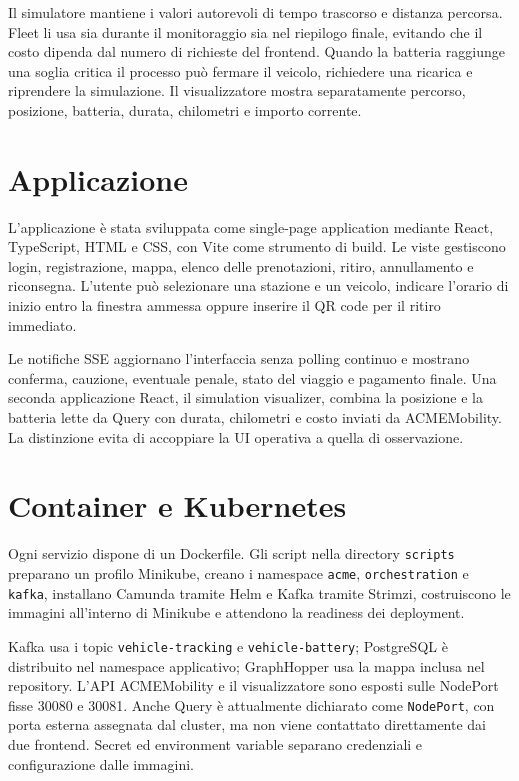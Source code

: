 \documentclass[12pt,a4paper,twoside]{report}
\newcommand{\code}[1]{\texttt{#1}}
\begin{document}
Il simulatore mantiene i valori autorevoli di tempo trascorso e distanza
percorsa. Fleet li usa sia durante il monitoraggio sia nel riepilogo finale,
evitando che il costo dipenda dal numero di richieste del frontend. Quando la
batteria raggiunge una soglia critica il processo può fermare il veicolo,
richiedere una ricarica e riprendere la simulazione. Il visualizzatore mostra
separatamente percorso, posizione, batteria, durata, chilometri e importo
corrente.

\section{Applicazione}

L'applicazione è stata sviluppata come single-page application mediante
React, TypeScript, HTML e CSS, con Vite come strumento di build. Le viste
gestiscono login, registrazione, mappa, elenco delle prenotazioni, ritiro,
annullamento e riconsegna. L'utente può selezionare una stazione e un veicolo,
indicare l'orario di inizio entro la finestra ammessa oppure inserire il QR
code per il ritiro immediato.

Le notifiche SSE aggiornano l'interfaccia senza polling continuo e mostrano
conferma, cauzione, eventuale penale, stato del viaggio e pagamento finale.
Una seconda applicazione React, il simulation visualizer, combina la
posizione e la batteria lette da Query con durata, chilometri e costo inviati
da ACMEMobility. La distinzione evita di accoppiare la UI operativa a quella
di osservazione.

\section{Container e Kubernetes}

Ogni servizio dispone di un Dockerfile. Gli script nella directory
\code{scripts} preparano un profilo Minikube, creano i namespace
\code{acme}, \code{orchestration} e \code{kafka}, installano Camunda tramite
Helm e Kafka tramite Strimzi, costruiscono le immagini all'interno di
Minikube e attendono la readiness dei deployment.

Kafka usa i topic \code{vehicle-tracking} e \code{vehicle-battery};
PostgreSQL è distribuito nel namespace applicativo; GraphHopper usa la mappa
inclusa nel repository. L'API ACMEMobility e il visualizzatore sono esposti
sulle NodePort fisse 30080 e 30081. Anche Query è attualmente dichiarato come
\code{NodePort}, con porta esterna assegnata dal cluster, ma non viene
contattato direttamente dai due frontend. Secret ed environment variable
separano credenziali e configurazione dalle immagini.
\end{document}
